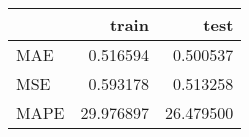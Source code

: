 \begin{tabular}{lrr}
\toprule
{} &      train &       test \\
\midrule
MAE  &   0.516594 &   0.500537 \\
MSE  &   0.593178 &   0.513258 \\
MAPE &  29.976897 &  26.479500 \\
\bottomrule
\end{tabular}
